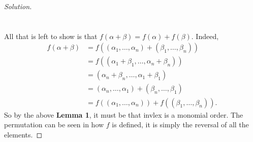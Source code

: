 \documentclass[]{article}
\newcommand\<{\langle}
\renewcommand\>{\rangle}
\newenvironment{solution}
{
	\begin{proof}[Solution] \text{ }
		\\
	}
	{
	\end{proof}
}
\begin{document}
\begin{solution}
	\\
	\\
	All that is left to show is that $f(\alpha + \beta) = f(\alpha) + f(\beta)$. Indeed,
	\begin{align*}
		f(\alpha + \beta) &= f\left(\left(\alpha_1,\dots,\alpha_n\right) + \left(\beta_1,\dots,\beta_n\right)\right) \\
		&= f\left(\left(\alpha_1 + \beta_1,\dots,\alpha_n + \beta_n\right)\right) \\
		&= \left(\alpha_n + \beta_n,\dots,\alpha_1 + \beta_1\right) \\
		&= \left(\alpha_n,\dots,\alpha_1\right) + \left(\beta_n,\dots,\beta_1\right) \\
		&= f\left(\left(\alpha_1,\dots,\alpha_n\right)\right) + f\left(\left(\beta_1,\dots,\beta_n\right)\right).
	\end{align*}
	So by the above \textbf{Lemma 1}, it must be that invlex is a monomial order. The permutation can be seen in how $f$ is defined, it is simply the reversal of all the elements. 
\end{solution}
\end{document}
